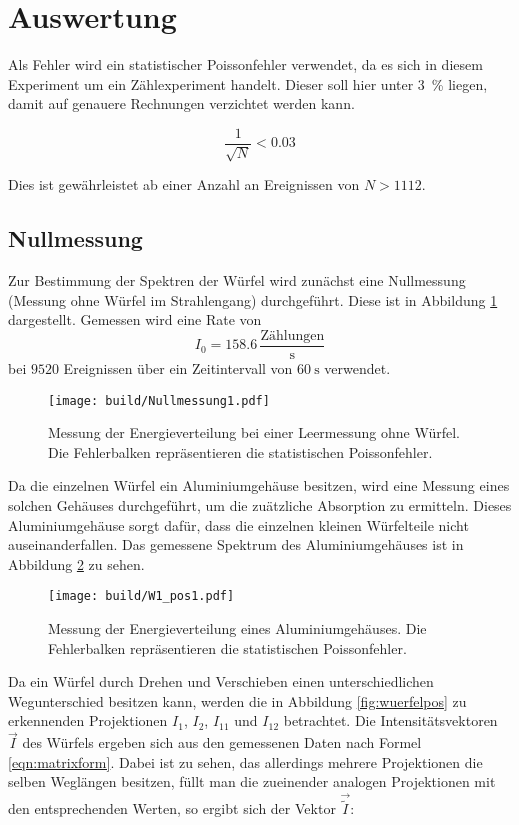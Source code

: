 \newpage
\section{Auswertung}

\label{sec:Auswertung}

Als Fehler wird ein statistischer Poissonfehler verwendet, da es sich in diesem
Experiment um ein Zählexperiment handelt. Dieser soll hier unter \SI{3}{\percent} liegen,
damit auf genauere Rechnungen verzichtet werden kann.

\begin{equation*}
  \frac{1}{\sqrt{N}} < 0.03
\end{equation*}

Dies ist gewährleistet ab einer Anzahl an Ereignissen von $N > \num{1112}$.

\subsection{Nullmessung}
Zur Bestimmung der Spektren der Würfel wird zunächst eine Nullmessung (Messung
ohne Würfel im Strahlengang) durchgeführt. Diese ist in Abbildung \ref{fig:leer}
dargestellt. Gemessen wird eine Rate von
\begin{equation*}
    I_0 = 158.6 \,\frac{\text{Zählungen}}{\text{s}}
\end{equation*}
bei $9520$ Ereignissen über ein Zeitintervall von $\SI{60}{\second}$ verwendet.

\begin{figure}[htb]
  \centering
  \texttt{[image: build/Nullmessung1.pdf]}
  \caption{Messung der Energieverteilung bei einer Leermessung ohne Würfel. Die
  Fehlerbalken repräsentieren die statistischen Poissonfehler.}
  \label{fig:leer}
\end{figure}
\FloatBarrier
Da die einzelnen Würfel ein Aluminiumgehäuse besitzen, wird eine Messung eines solchen
Gehäuses durchgeführt, um die zuätzliche Absorption zu ermitteln. Dieses Aluminiumgehäuse
sorgt dafür, dass die einzelnen kleinen Würfelteile nicht auseinanderfallen. Das
gemessene Spektrum des Aluminiumgehäuses ist in
Abbildung \ref{fig:alu} zu sehen.

\begin{figure}[htb]
  \centering
  \texttt{[image: build/W1\_pos1.pdf]}
  \caption{Messung der Energieverteilung eines Aluminiumgehäuses. Die Fehlerbalken
  repräsentieren die statistischen Poissonfehler.}
  \label{fig:alu}
\end{figure}
\FloatBarrier
Da ein Würfel durch Drehen und Verschieben einen unterschiedlichen Wegunterschied
besitzen kann, werden die in Abbildung \ref{fig:wuerfelpos} zu erkennenden Projektionen
$I_1$, $I_2$, $I_{11}$ und $I_{12}$ betrachtet. Die Intensitätsvektoren $\vec{I}$ des Würfels ergeben sich aus
den gemessenen Daten nach Formel \eqref{eqn:matrixform}.
Dabei ist zu sehen, das allerdings mehrere Projektionen die selben Weglängen
besitzen, füllt man die zueinender analogen Projektionen mit den entsprechenden Werten,
so ergibt sich der Vektor $\vec{\tilde{I}}$:

